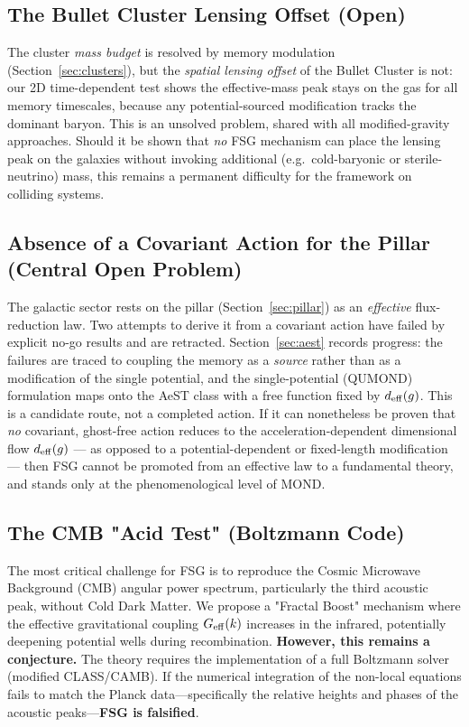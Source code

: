 \documentclass[11pt,a4paper]{article}
\begin{document}
\begin{onehalfspacing}
\subsection{The Bullet Cluster Lensing Offset (Open)}
The cluster \emph{mass budget} is resolved by memory modulation (Section~\ref{sec:clusters}), but the \emph{spatial lensing offset} of the Bullet Cluster is not: our 2D time-dependent test shows the effective-mass peak stays on the gas for all memory timescales, because any potential-sourced modification tracks the dominant baryon. This is an unsolved problem, shared with all modified-gravity approaches. Should it be shown that \emph{no} FSG mechanism can place the lensing peak on the galaxies without invoking additional (e.g.\ cold-baryonic or sterile-neutrino) mass, this remains a permanent difficulty for the framework on colliding systems.
\subsection{Absence of a Covariant Action for the Pillar (Central Open Problem)}
The galactic sector rests on the pillar (Section~\ref{sec:pillar}) as an \emph{effective} flux-reduction law. Two attempts to derive it from a covariant action have failed by explicit no-go results and are retracted. Section~\ref{sec:aest} records progress: the failures are traced to coupling the memory as a \emph{source} rather than as a modification of the single potential, and the single-potential (QUMOND) formulation maps onto the AeST class \cite{SkordisZlosnik2021} with a free function fixed by $d_{\rm eff}(g)$. This is a candidate route, not a completed action. If it can nonetheless be proven that \emph{no} covariant, ghost-free action reduces to the acceleration-dependent dimensional flow $d_{\rm eff}(g)$ --- as opposed to a potential-dependent or fixed-length modification --- then FSG cannot be promoted from an effective law to a fundamental theory, and stands only at the phenomenological level of MOND.
\subsection{The CMB "Acid Test" (Boltzmann Code)}
The most critical challenge for FSG is to reproduce the Cosmic Microwave Background (CMB) angular power spectrum, particularly the third acoustic peak, without Cold Dark Matter.
We propose a "Fractal Boost" mechanism where the effective gravitational coupling $G_{\rm eff}(k)$ increases in the infrared, potentially deepening potential wells during recombination.
\textbf{However, this remains a conjecture.}
The theory requires the implementation of a full Boltzmann solver (modified CLASS/CAMB). If the numerical integration of the non-local equations fails to match the Planck data—specifically the relative heights and phases of the acoustic peaks—\textbf{FSG is falsified}.

\end{onehalfspacing}
\end{document}
